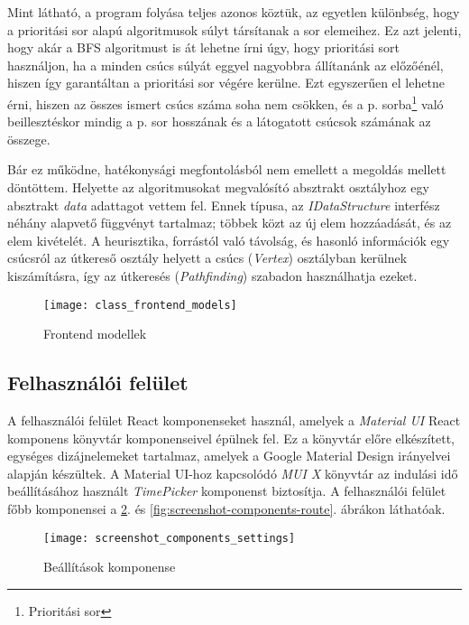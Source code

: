 Mint látható, a program folyása teljes azonos köztük, az egyetlen különbség, hogy a prioritási sor alapú algoritmusok súlyt társítanak a sor elemeihez. Ez azt jelenti, hogy akár a BFS algoritmust is át lehetne írni úgy, hogy prioritási sort használjon, ha a minden csúcs súlyát eggyel nagyobbra állítanánk az előzőénél, hiszen így garantáltan a prioritási sor végére kerülne. Ezt egyszerűen el lehetne érni, hiszen az összes ismert csúcs száma soha nem csökken, és a p. sorba\footnote{Prioritási sor} való beillesztéskor mindig a p. sor hosszának és a látogatott csúcsok számának az összege.

Bár ez működne, hatékonysági megfontolásból nem emellett a megoldás mellett döntöttem. Helyette az algoritmusokat megvalósító absztrakt osztályhoz egy absztrakt \textit{data} adattagot vettem fel. Ennek típusa, az \textit{IDataStructure} interfész néhány alapvető függvényt tartalmaz; többek közt az új elem hozzáadását, és az elem kivételét. A heurisztika, forrástól való távolság, és hasonló információk egy csúcsról az útkereső osztály helyett a csúcs (\textit{Vertex}) osztályban kerülnek kiszámításra, így az útkeresés (\textit{Pathfinding}) szabadon használhatja ezeket.

\begin{figure}[H]
    \centering
    \texttt{[image: class\_frontend\_models]}
    \caption{Frontend modellek}
    \label{fig:frontend-models}
\end{figure}

\subsection{Felhasználói felület}

A felhasználói felület React komponenseket használ, amelyek a \textit{Material UI} React komponens könyvtár komponenseivel épülnek fel. Ez a könyvtár előre elkészített, egységes dizájnelemeket tartalmaz, amelyek a Google Material Design irányelvei alapján készültek\cite{mui}. A Material UI-hoz kapcsolódó \textit{MUI X} könyvtár az indulási idő beállításához használt \textit{TimePicker} komponenst biztosítja. A felhasználói felület főbb komponensei a \ref{fig:screenshot-components-settings}. és \ref{fig:screenshot-components-route}. ábrákon láthatóak.

\begin{figure}[H]
    \centering
    \texttt{[image: screenshot\_components\_settings]}
    \caption{Beállítások komponense}
    \label{fig:screenshot-components-settings}
\end{figure}

